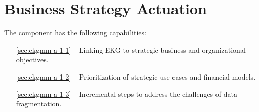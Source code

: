 \chapter{Business Strategy Actuation}\label{ch:ekgmm-a-1} %

The  component has the following capabilities:

\begin{itemize}[leftmargin=.5in]
  \item [\ref{sec:ekgmm-a-1-1}]  -- Linking EKG to strategic business and organizational objectives.
  \item [\ref{sec:ekgmm-a-1-2}]  -- Prioritization of strategic use cases and financial models.
  \item [\ref{sec:ekgmm-a-1-3}]  -- Incremental steps to address the challenges of data fragmentation.
\end{itemize}




